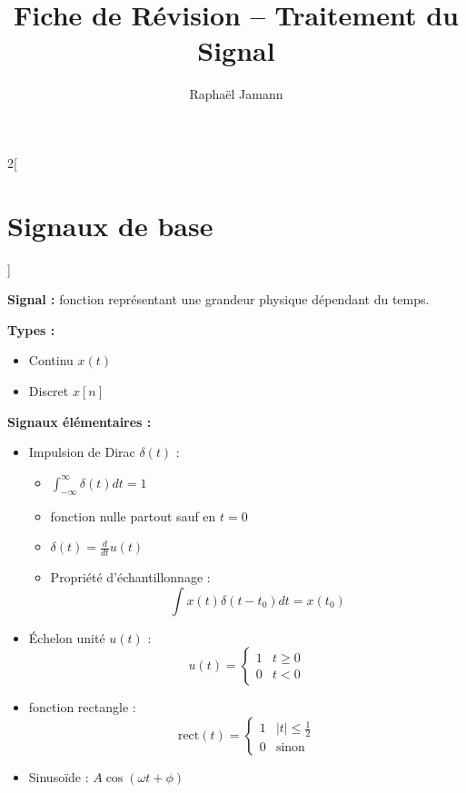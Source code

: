 \documentclass[a4paper,10pt]{article}
\title{\textbf{Fiche de Révision -- Traitement du Signal}}
\date{}
\author{Raphaël Jamann}
\begin{document}
    \maketitle

    \begin{multicols}{2}[
        \section{Signaux de base}
    ]

        \textbf{Signal :} fonction représentant une grandeur physique dépendant du temps.

        \textbf{Types :}
        \begin{itemize}
            \item Continu $x(t)$
            \item Discret $x[n]$
        \end{itemize}

        \textbf{Signaux élémentaires :}
        \begin{itemize}
            \item Impulsion de Dirac $\delta(t)$ :
 
            \begin{itemize}
                \item $\int_{-\infty}^\infty \delta(t)dt = 1$ \\
                \item fonction nulle partout sauf en $t=0$
                \item $\delta(t) = \frac{d}{dt}u(t)$
                \item Propriété d'échantillonnage :
                \[
                \int x(t)\delta(t-t_0)dt = x(t_0)
                \]
            \end{itemize}

            \item Échelon unité $u(t)$ :
            \[
                u(t)=
                \begin{cases}
                1 & t \ge 0 \\
                0 & t < 0
                \end{cases}
            \]
            \item fonction rectangle : 
            \[
                \text{rect}(t) =
                \begin{cases}
                1 & |t| \le \frac{1}{2} \\
                0 & \text{sinon}
                \end{cases}
            \]
            \item Sinusoïde : $A \cos(\omega t + \phi)$
        \end{itemize}


\end{multicols}
\end{document}
